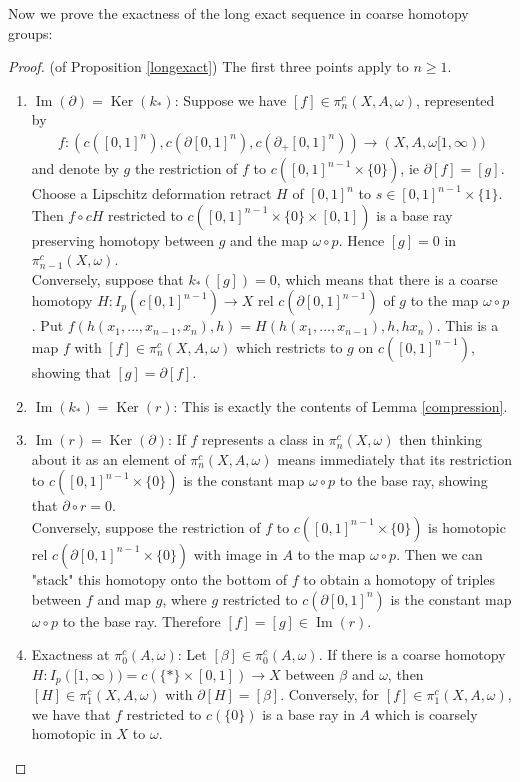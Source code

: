 \documentclass[a4paper,11pt]{article}
\theoremstyle{definition}
\theoremstyle{plain}
\theoremstyle{remark}
\DeclareMathOperator{\Ker}{Ker}
\DeclareMathOperator{\image}{Im}
\begin{document}
Now we prove the exactness of the long exact sequence in coarse homotopy groups:

\begin{proof}  (of Proposition \ref{longexact}) The first three points apply to $n \geq 1$. 
\begin{enumerate}
\item $\image(\partial)=\Ker(k_*)$: Suppose we have $[f]\in \pi_n^c(X,A,\omega)$, represented by 
\begin{align*}
f:(c([0,1]^n), c(\partial [0,1]^n), c(\partial_{+}[0,1]^n))\rightarrow (X,A,\omega[1,\infty))
\end{align*}
and denote by $g$ the restriction of $f$ to $ c([0,1]^{n-1} \times \{0\})$, ie $\partial[f]=[g]$. Choose a Lipschitz deformation retract $H$ of $[0,1]^n$ to $s \in [0,1]^{n-1} \times \{1\}$. Then $f\circ cH$ restricted to $c([0,1]^{n-1} \times \{0\} \times [0,1])$ is a base ray preserving homotopy between $g$ and the map $\omega \circ p$. Hence $[g] = 0$ in $\pi_{n-1}^c(X,\omega)$. \\

Conversely, suppose that $k_*([g])=0$, which means that there is a coarse homotopy $H: I_p(c[0,1]^{n-1})\rightarrow X$ rel $c(\partial[0,1]^{n-1})$ of $g$ to the map $\omega \circ p$. Put $f(h(x_1,\dots,x_{n-1},x_n),h) = H(h(x_1,\dots,x_{n-1}),h,hx_n)$. This is a map $f$ with $[f]\in \pi_n^c(X,A,\omega)$ which restricts to $g$ on $c([0,1]^{n-1})$, showing that $[g]=\partial [f]$.
\item $\image(k_*) = \Ker{(r)}$: This is exactly the contents of Lemma \ref{compression}.
\item $\image{(r)} = \Ker(\partial)$: If $f$ represents a class in $\pi_n^c(X,\omega)$ then thinking about it as an element of $\pi_n^c(X,A,\omega)$ means immediately that its restriction to $c([0,1]^{n-1} \times \{0\})$ is the constant map $\omega \circ p$ to the base ray, showing that $\partial \circ r = 0$.\\

Conversely, suppose the restriction of $f$  to $c([0,1]^{n-1} \times \{0\})$ is homotopic rel $c(\partial [0,1]^{n-1} \times \{0\})$ with image in $A$ to the map $\omega \circ p$. Then we can "stack" this homotopy onto the bottom of $f$ to obtain a homotopy of triples between $f$ and map $g$, where $g$ restricted to $c(\partial[0,1]^n)$ is the constant map $\omega \circ p$ to the base ray. Therefore $[f]=[g] \in \image (r)$. 
\item Exactness at $\pi^{c}_0(A,\omega)$: Let $[\beta]\in \pi^c_{0}(A,\omega)$. If there is a coarse homotopy $H: I_{p}([1,\infty))=c(\{\ast\} \times [0,1])\rightarrow X$ between $\beta$ and $\omega$, then $[H]\in \pi^c_1(X,A,\omega)$ with $\partial[H]=[\beta]$. Conversely, for $[f]\in  \pi^c_1(X,A,\omega)$, we have that $f$ restricted to $c(\{0\})$ is a base ray in $A$ which is coarsely homotopic in $X$ to $\omega$. 
\end{enumerate}
\end{proof}
\end{document}
